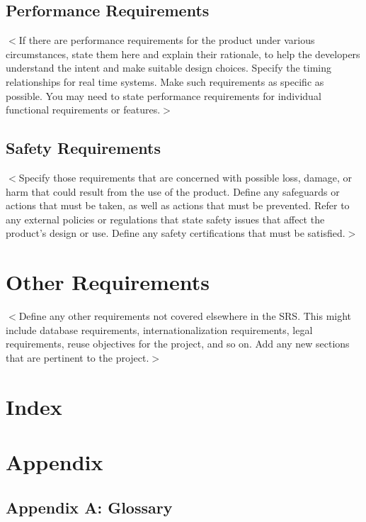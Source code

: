 \documentclass[draftclsnofoot,onecolumn,10pt]{IEEEtran}
\begin{document}
\subsection{Performance Requirements}
$<$If there are performance requirements for the product under various 
circumstances, state them here and explain their rationale, to help the 
developers understand the intent and make suitable design choices. Specify the 
timing relationships for real time systems. Make such requirements as specific 
as possible. You may need to state performance requirements for individual 
functional requirements or features.$>$

\subsection{Safety Requirements}
$<$Specify those requirements that are concerned with possible loss, damage, or 
harm that could result from the use of the product. Define any safeguards or 
actions that must be taken, as well as actions that must be prevented. Refer to 
any external policies or regulations that state safety issues that affect the 
product’s design or use. Define any safety certifications that must be 
satisfied.$>$

\section{Other Requirements}
$<$Define any other requirements not covered elsewhere in the SRS. This might 
include database requirements, internationalization requirements, legal 
requirements, reuse objectives for the project, and so on. Add any new sections 
that are pertinent to the project.$>$

\section{Index}

\section{Appendix}

\subsection{Appendix A: Glossary}
\end{document}
